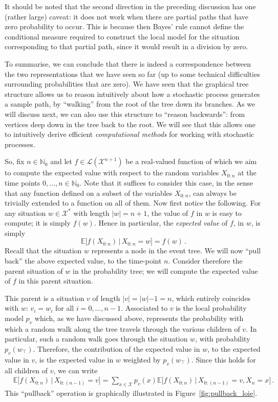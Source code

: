 \documentclass[graybox]{svmult}
\newcommand{\nats}{\mathbb{N}}
\newcommand{\natswith}{\nats_{0}}
\newcommand{\states}{\mathcal{X}}
\newcommand{\gambles}{\mathcal{L}}
\begin{document}
It should be noted that the second direction in the preceding discussion has one (rather large) caveat: it does not work when there are partial paths that have zero probability to occur. This is because then Bayes' rule cannot define the conditional measure required to construct the local model for the situation corresponding to that partial path, since it would result in a division by zero.

To summarise, we can conclude that there is indeed a correspondence between the two representations that we have seen so far (up to some technical difficulties surrounding probabilities that are zero). We have seen that the graphical tree structure allows us to reason intuitively about how a stochastic process generates a sample path, by ``walking'' from the root of the tree down its branches. As we will discuss next, we can also use this structure to ``reason backwards'': from vertices deep down in the tree back to the root. We will see that this allows one to intuitively derive efficient \emph{computational methods} for working with stochastic processes. 

So, fix $n\in\natswith$ and let $f\in\gambles(\states^{n+1})$ be a real-valued function of which we aim to compute the expected value with respect to the random variables $X_{0:n}$ at the time points $0,\ldots,n\in\natswith$. Note that it suffices to consider this case, in the sense that any function defined on a subset of the variables $X_{0:n}$, can always be trivially extended to a function on all of them. Now first notice the following. For any situation $w\in\states^*$ with length $\lvert w\rvert = n+1$, the value of $f$ in $w$ is easy to compute; it is simply $f(w)$. Hence in particular, the \emph{expected value} of $f$, in $w$, is simply
\begin{equation*}
\mathbb{E}\bigl[f(X_{0:n})\,\big\vert\,X_{0:n}=w\bigr] = f(w)\,.
\end{equation*}
Recall that the situation $w$ represents a node in the event tree. We will now ``pull back'' the above expected value, to the time-point $n$. Consider therefore the parent situation of $w$ in the probability tree; we will compute the expected value of $f$ in this parent situation.

This parent is a situation $v$ of length $\lvert v\lvert=\lvert w\lvert-1=n$, which entirely coincides with $w$: $v_i=w_i$ for all $i=0,\ldots,n-1$. Associated to $v$ is the local probability model $p_v$ which, as we have discussed above, represents the probability with which a random walk along the tree travels through the various children of $v$. In particular, such a random walk goes through the situation $w$, with probability $p_v(w_\top)$. Therefore, the contribution of the expected value in $w$, to the expected value in $v$, is the expected value in $w$ weighted by $p_v(w_\top)$. Since this holds for all children of $v$, we can write
\begin{align*}
&\mathbb{E}\bigl[f(X_{0:n}) \,\big\vert\, X_{0:(n-1)}=v \bigr] = \sum_{x\in\states} p_v(x)\mathbb{E}\bigl[f(X_{0:n})\,\big\vert\,X_{0:(n-1)}=v,X_n=x\bigr]\,.
\end{align*}
This ``pullback'' operation is graphically illustrated in Figure~\ref{fig:pullback_loie}.
\end{document}

